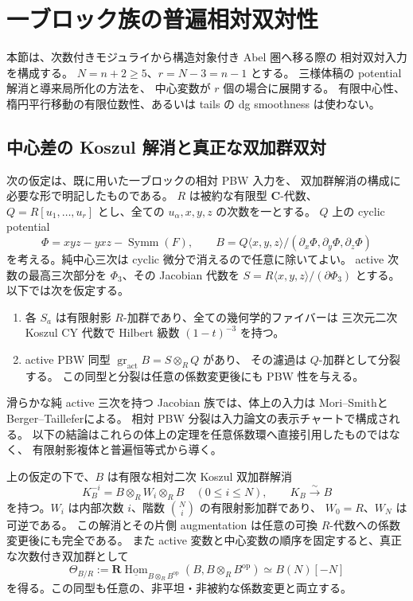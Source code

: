 \section{一ブロック族の普遍相対双対性}
\label{sec:nfm-relative-duality}

本節は、次数付きモジュライから構造対象付き Abel 圏へ移る際の
相対双対入力を構成する。
$N=n+2\geq5$、$r=N-3=n-1$ とする。
三様体稿\cite{Threefold}の potential 解消と導来局所化の方法を、
中心変数が $r$ 個の場合に展開する。
有限中心性、楕円平行移動の有限位数性、あるいは tails の dg smoothness は使わない。

\subsection{中心差の Koszul 解消と真正な双加群双対}

次の仮定は、既に用いた一ブロックの相対 PBW 入力を、
双加群解消の構成に必要な形で明記したものである。
$R$ は被約な有限型 $\mathbf C$-代数、
$Q=R[u_1,\ldots,u_r]$ とし、全ての $u_\alpha,x,y,z$ の次数を一とする。
$Q$ 上の cyclic potential
\[
 \Phi=xyz-yxz-\operatorname{Symm}(F),\qquad
 B=Q\langle x,y,z\rangle/(\partial_x\Phi,\partial_y\Phi,\partial_z\Phi)
\]
を考える。純中心三次は cyclic 微分で消えるので任意に除いてよい。
active 次数の最高三次部分を $\Phi_3$、その Jacobian 代数を
$S=R\langle x,y,z\rangle/(\partial\Phi_3)$ とする。
以下では次を仮定する。
\begin{enumerate}
\item 各 $S_a$ は有限射影 $R$-加群であり、全ての幾何学的ファイバーは
三次元二次 Koszul CY 代数で Hilbert 級数 $(1-t)^{-3}$ を持つ。
\item active PBW 同型 $\operatorname{gr}_{\mathrm{act}}B=S\otimes_RQ$ があり、
その濾過は $Q$-加群として分裂する。
この同型と分裂は任意の係数変更後にも PBW 性を与える。
\end{enumerate}
滑らかな純 active 三次を持つ Jacobian 族では、体上の入力は
Mori--Smith\cite[Theorem~4.2]{MoriSmith}と
Berger--Taillefer\cite[Theorems~3.1, 3.6]{NFMBeTa}による。
相対 PBW 分裂は入力論文\cite{CubicQuantization}の表示チャートで構成される。
以下の結論はこれらの体上の定理を任意係数環へ直接引用したものではなく、
有限射影複体と普遍恒等式から導く。

\begin{theorem}[任意個の中心変数を持つ相対 CY 解消]
\label{thm:nfm-relative-ambient-cy}
上の仮定の下で、$B$ は有限な相対二次 Koszul 双加群解消
\[
 K_B^{-i}=B\otimes_RW_i\otimes_RB\quad(0\leq i\leq N),
 \qquad K_B\xrightarrow{\sim}B
\]
を持つ。$W_i$ は内部次数 $i$、階数 $\binom Ni$ の有限射影加群であり、
$W_0=R$、$W_N$ は可逆である。
この解消とその片側 augmentation は任意の可換 $R$-代数への係数変更後にも完全である。
また active 変数と中心変数の順序を固定すると、真正な次数付き双加群として
\begin{equation}
\label{eq:nfm-relative-ambient-cy}
 \Theta_{B/R}:=
 \mathbf R\underline{\operatorname{Hom}}_{B\otimes_RB^{\mathrm{op}}}
       (B,B\otimes_RB^{\mathrm{op}})
 \simeq B(N)[-N]
\end{equation}
を得る。この同型も任意の、非平坦・非被約な係数変更と両立する。
\end{theorem}

